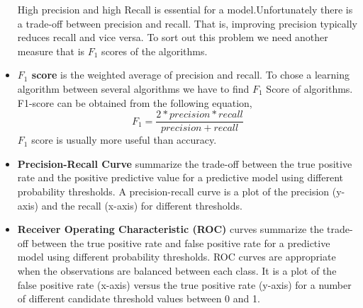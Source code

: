 \begin{itemize}
High precision and high Recall is essential for a model.Unfortunately there is a trade-off between precision and recall. That is, improving precision typically reduces recall and vice versa. To sort out this problem we need another measure that is $F_1$ scores of the algorithms.

\vspace{0.3cm}
\item{\textbf{$F_1$ score}} is the weighted average of precision and recall. To chose a learning algorithm between several algorithms we have to find $F_1$ Score of algorithms. F1-score can be obtained from the following equation,
 \begin{equation}
     F_1 = \frac{2*precision*recall}{precision+recall}
 \end{equation}
$F_1$ score is usually more useful than accuracy.

\vspace{0.3cm}
\item{\textbf{Precision-Recall Curve}} summarize the trade-off between the true positive rate and the positive predictive value for a predictive model using different probability thresholds. A precision-recall curve is a plot of the precision (y-axis) and the recall (x-axis) for different thresholds.

\vspace{0.3cm}
\item{\textbf{Receiver Operating Characteristic (ROC)}}
 curves summarize the trade-off between the true positive rate and false positive rate for a predictive model using different probability thresholds. ROC curves are appropriate when the observations are balanced between each class. It is a plot of the false positive rate (x-axis) versus the true positive rate (y-axis) for a number of different candidate threshold values between 0 and 1.
\end{itemize}